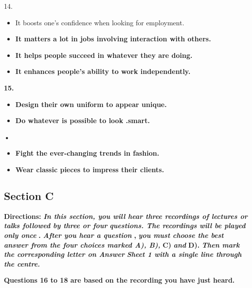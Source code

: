 \documentclass[UTF8,11pt]{ctexart}
\begin{document}
14.


\begin{itemize}[leftmargin=2em,itemsep=.2em,topsep=.4em]\item[A.] It boosts one's confidence when looking for employment.
\end{itemize}

\begin{itemize}[leftmargin=2em,itemsep=.2em,topsep=.4em]\item[B.] \textbf{It matters a lot in jobs involving interaction with others.}
\item[C.] \textbf{It helps people succeed in whatever they are doing.}
\item[D.] \textbf{It enhances people's ability to work independently.}
\end{itemize}

\textbf{15.}


\begin{itemize}[leftmargin=2em,itemsep=.2em,topsep=.4em]\item[A.] \textbf{Design their own uniform to appear unique.}
\item[C.] \textbf{Do whatever is possible to look .smart.}
\end{itemize}

\textbf{•}


\begin{itemize}[leftmargin=2em,itemsep=.2em,topsep=.4em]\item[B.] \textbf{Fight the ever-changing trends in fashion.}
\item[D.] \textbf{Wear classic pieces to impress their clients.}
\end{itemize}

\subsection*{\textbf{Section C}}


\textbf{Directions: }\textbf{\textit{In this section, you will hear three recordings of lectures or talks followed by three or four}} \textbf{\textit{questions. The recordings will be played only once }}\textbf{. }\textbf{\textit{After you hear a question }}\textbf{, }\textbf{\textit{you must choose the best}} \textbf{\textit{answer from the four choices marked A), B), }}\textbf{C) }\textbf{\textit{and }}\textbf{D). }\textbf{\textit{Then mark the corresponding letter on Answer}} \textbf{\textit{Sheet 1 with a single line through the centre.}}


\textbf{Questions 16 to 18 are based on the recording you have just heard.}
\end{document}
